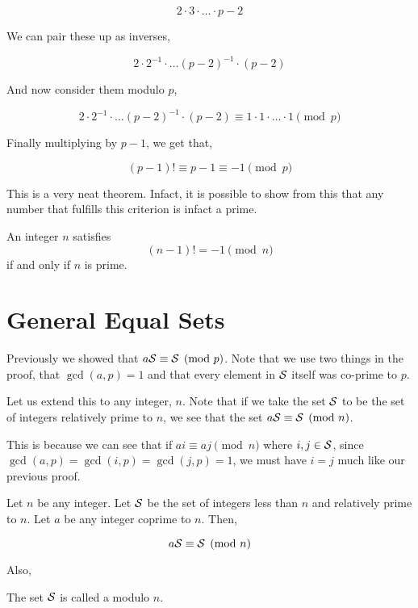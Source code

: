 \[2 \cdot 3 \cdot \dots \cdot p-2\]

We can pair these up as inverses,

\[2 \cdot 2^{-1} \cdot \dots (p-2)^{-1} \cdot (p-2)\]

And now consider them modulo \(p\),

\[2 \cdot 2^{-1} \cdot \dots (p-2)^{-1} \cdot (p-2) \equiv 1 \cdot 1 \cdot \dots \cdot 1 \pmod{p}\]

Finally multiplying by \(p-1\), we get that,

\[(p-1)! \equiv p-1 \equiv -1 \pmod{p}\]

This is a very neat theorem. Infact, it is possible to show from this that
any number that fulfills this criterion is infact a prime.

\begin{theorem}
    \label{thm: wilson}
    An integer \(n\) satisfies 
    \[(n-1)! = -1 \pmod{n}\]
    if and only if \(n\) is prime.
\end{theorem}

\section{General Equal Sets}

Previously we showed that \(a\mathcal{S} \equiv \mathcal{S} \pmod{p}\). Note that we use two things 
in the proof, that \(\gcd(a, p) = 1\) and that every element in \(\mathcal{S}\) itself was co-prime 
to \(p\). 

Let us extend this to any integer, \(n\). Note that if we take the set \(\mathcal{S}\) to be the 
set of integers relatively prime to \(n\), we see that the set \(a\mathcal{S} \equiv \mathcal{S} \pmod{n}\).

This is because we can see that if \(ai \equiv aj \pmod{n}\) where \(i, j \in \mathcal{S}\), 
since \(\gcd(a, p) = \gcd(i, p) = \gcd(j, p) = 1\), we must have \(i = j\) much like our previous 
proof. 

\begin{theorem} 
    Let \(n\) be any integer. Let \(\mathcal{S}\) be the set of integers less
    than \(n\) and relatively prime to \(n\). Let \(a\) be any integer coprime to \(n\). Then,

    \begin{equation}
        a\mathcal{S} \equiv \mathcal{S} \pmod{n}
    \end{equation}

\end{theorem}

Also, 

\begin{definition}
    The set \(\mathcal{S}\) is called a  modulo \(n\).
\end{definition}

